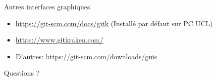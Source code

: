\documentclass{beamer}
\begin{document}
\begin{frame}{Autres interfaces graphiques}
    \begin{itemize}
        \item \url{https://git-scm.com/docs/gitk} (Installé par défaut sur PC UCL)
        \item \url{https://www.gitkraken.com/}
        \item D'autres: \url{https://git-scm.com/downloads/guis}
    \end{itemize}
\end{frame}

\begin{frame}[standout]
    Questions ?
\end{frame}
\end{document}

